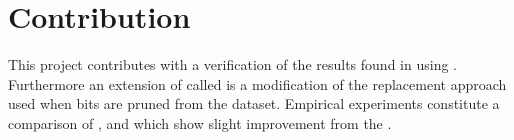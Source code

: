 \section{Contribution}
\label{contribution}
This project contributes with a verification of the results found in \cite{wagner17} using \qs{}. Furthermore an extension of \qs{} called \qsr{} is a modification of the replacement approach used when bits are pruned from the dataset. Empirical experiments constitute a comparison of \qs{}, \grid{} and \qsr{} which show slight improvement from the \qs{}.

